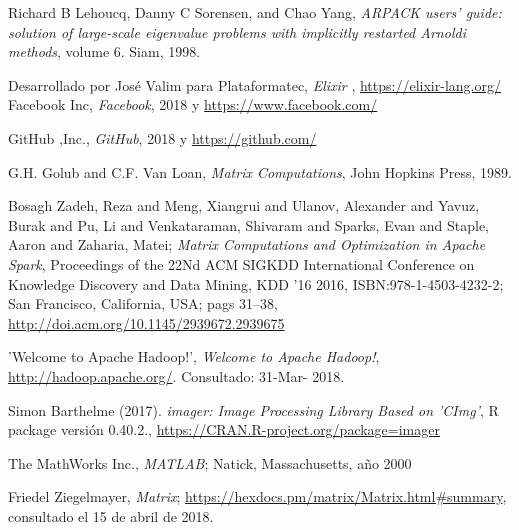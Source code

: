 \documentclass[conference]{IEEEtran}
\begin{document}
\newpage
\begin{thebibliography}{1}
Richard B Lehoucq, Danny C Sorensen, and Chao Yang, \textit{ARPACK users' guide: solution of large-scale eigenvalue problems with implicitly restarted Arnoldi methods}, volume 6. Siam, 1998.

Desarrollado por José Valim para Plataformatec, \emph{Elixir} , \url{https://elixir-lang.org/}
Facebook Inc, \emph{Facebook}, 2018 y \url{https://www.facebook.com/}

GitHub ,Inc., \emph{GitHub}, 2018 y \url{https://github.com/}

G.H. Golub and C.F. Van Loan, \emph{Matrix Computations}, John
Hopkins Press, 1989.

Bosagh Zadeh, Reza and Meng, Xiangrui and Ulanov, Alexander and Yavuz, Burak and Pu, Li and Venkataraman, Shivaram and Sparks, Evan and Staple, Aaron and Zaharia, Matei; \textit{Matrix Computations and Optimization in Apache Spark}, Proceedings of the 22Nd ACM SIGKDD International Conference on Knowledge Discovery and Data Mining, KDD '16 2016, ISBN:978-1-4503-4232-2; San Francisco, California, USA; pags 31--38,
\url{http://doi.acm.org/10.1145/2939672.2939675}


'Welcome to Apache Hadoop!',  \emph{Welcome to Apache Hadoop!}, \url{http://hadoop.apache.org/}. Consultado: 31-Mar-
2018.

Simon Barthelme (2017). \emph{imager: Image Processing
  Library Based on 'CImg'}, R package versión  0.40.2., \url{  https://CRAN.R-project.org/package=imager}

The MathWorks Inc., \emph{MATLAB}; Natick, Massachusetts, año 2000

 Friedel Ziegelmayer, \emph{Matrix}; \url{https://hexdocs.pm/matrix/Matrix.html#summary}, consultado el 15 de abril de 2018.



\end{thebibliography}
\end{document}
